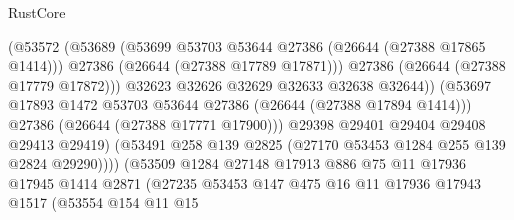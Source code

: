 \begin{lexlean}{RustCore}
\begin{coremodule}
                                      (@53572
                                        (@53689
                                          (@53699
                                            @53703
                                            @53644
                                            @27386
                                            (@26644 (@27388 @17865 @1414)))
                                          @27386
                                          (@26644 (@27388 @17789 @17871)))
                                        @27386
                                        (@26644 (@27388 @17779 @17872)))
                                      @32623
                                      @32626
                                      @32629
                                      @32633
                                      @32638
                                      @32644))
                                  (@53697
                                    @17893
                                    @1472
                                    @53703
                                    @53644
                                    @27386
                                    (@26644 (@27388 @17894 @1414)))
                                  @27386
                                  (@26644 (@27388 @17771 @17900)))
                                @29398
                                @29401
                                @29404
                                @29408
                                @29413
                                @29419)
                              (@53491
                                @258
                                @139
                                @2825
                                (@27170 @53453 @1284 @255 @139 @2824 @29290))))
                          (@53509
                            @1284
                            @27148
                            @17913
                            @886
                            @75
                            @11
                            @17936
                            @17945
                            @1414
                            @2871
                            (@27235
                              @53453
                              @147
                              @475
                              @16
                              @11
                              @17936
                              @17943
                              @1517
                              (@53554
                                @154
                                @11
                                @15

\end{coremodule}
\end{lexlean}
